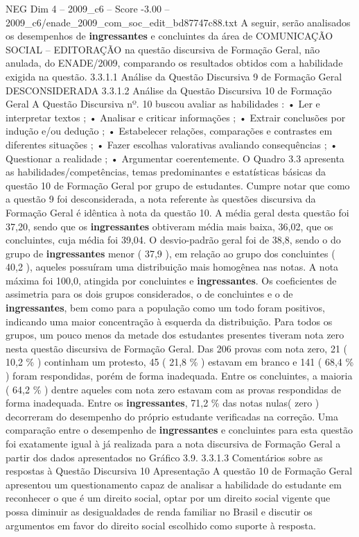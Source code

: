 \begin{textsample}{NEG Dim 4 – 2009\_c6 – Score -3.00 – 2009\_c6/enade\_2009\_com\_soc\_edit\_bd87747c88.txt}
A seguir, serão analisados os desempenhos de \textbf{ingressantes} e concluintes da área de COMUNICAÇÃO SOCIAL – EDITORAÇÃO na questão discursiva de Formação Geral, não anulada, do ENADE/2009, comparando os resultados obtidos com a habilidade exigida na questão. 3.3.1.1 Análise da Questão Discursiva 9 de Formação Geral DESCONSIDERADA 3.3.1.2 Análise da Questão Discursiva 10 de Formação Geral A Questão Discursiva nº. 10 buscou avaliar as habilidades : • Ler e interpretar textos ; • Analisar e criticar informações ; • Extrair conclusões por indução e/ou dedução ; • Estabelecer relações, comparações e contrastes em diferentes situações ; • Fazer escolhas valorativas avaliando consequências ; • Questionar a realidade ; • Argumentar coerentemente.
O Quadro 3.3 apresenta as habilidades/competências, temas predominantes e estatísticas básicas da questão 10 de Formação Geral por grupo de estudantes.
Cumpre notar que como a questão 9 foi desconsiderada, a nota referente às questões discursiva da Formação Geral é idêntica à nota da questão 10.
A média geral desta questão foi 37,20, sendo que os \textbf{ingressantes} obtiveram média mais baixa, 36,02, que os concluintes, cuja média foi 39,04.
O desvio-padrão geral foi de 38,8, sendo o do grupo de \textbf{ingressantes} menor ( 37,9 ), em relação ao grupo dos concluintes ( 40,2 ), aqueles possuíram uma distribuição mais homogênea nas notas.
A nota máxima foi 100,0, atingida por concluintes e \textbf{ingressantes}.
Os coeficientes de assimetria para os dois grupos considerados, o de concluintes e o de \textbf{ingressantes}, bem como para a população como um todo foram positivos, indicando uma maior concentração à esquerda da distribuição.
Para todos os grupos, um pouco menos da metade dos estudantes presentes tiveram nota zero nesta questão discursiva de Formação Geral.
Das 206 provas com nota zero, 21 ( 10,2 \% ) continham um protesto, 45 ( 21,8 \% ) estavam em branco e 141 ( 68,4 \% ) foram respondidas, porém de forma inadequada.
Entre os concluintes, a maioria ( 64,2 \% ) dentre aqueles com nota zero estavam com as provas respondidas de forma inadequada.
Entre os \textbf{ingressantes}, 71,2 \% das notas nulas( zero ) decorreram do desempenho do próprio estudante verificadas na correção.
Uma comparação entre o desempenho de \textbf{ingressantes} e concluintes para esta questão foi exatamente igual à já realizada para a nota discursiva de Formação Geral a partir dos dados apresentados no Gráfico 3.9. 3.3.1.3 Comentários sobre as respostas à Questão Discursiva 10 Apresentação A questão 10 de Formação Geral apresentou um questionamento capaz de analisar a habilidade do estudante em reconhecer o que é um direito social, optar por um direito social vigente que possa diminuir as desigualdades de renda familiar no Brasil e discutir os argumentos em favor do direito social escolhido como suporte à resposta.

\end{textsample}
